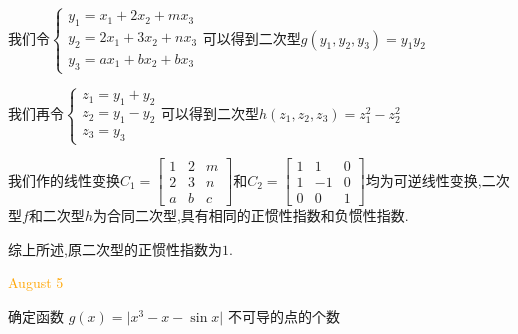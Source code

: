 \begin{solution}

	我们令$\left\lbrace
	\begin{array}{l}
		y_{1}=x_{1}+2x_{2}+mx_{3}\\
		y_{2}=2x_{1}+3x_{2}+nx_{3}\\
		y_{3}=ax_{1}+bx_{2}+bx_{3}
	\end{array}
	\right. $可以得到二次型$g(y_{1},y_{2},y_{3})=y_{1}y_{2}$
	
	我们再令$\left\lbrace
	\begin{array}{l}
		z_{1}=y_{1}+y_{2}\\
		z_{2}=y_{1}-y_{2}\\
		z_{3}=y_{3}
	\end{array}
	\right. $可以得到二次型$h(z_{1},z_{2},z_{3})=z_{1}^2-z_{2}^2$
	
	我们作的线性变换$C_{1}=\left[ \begin{matrix}
		1&2&m\\2&3&n\\a&b&c
	\end{matrix}\right] $和$C_{2}=\left[ \begin{matrix}
	1&1&0\\1&-1&0\\0&0&1
\end{matrix}\right] $均为可逆线性变换,二次型$f$和二次型$h$为合同二次型,具有相同的正惯性指数和负惯性指数.

综上所述,原二次型的正惯性指数为$1$.
\end{solution}
 

\textcolor{orange}{August 5}

\begin{example}[][Exam: 34.1.9]
	确定函数 $g(x)=\big|x^3-x-\sin x\big|$ 不可导的点的个数
\end{example}

